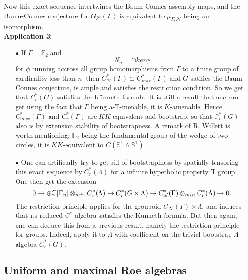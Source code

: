 Now this exact sequence intertwines the Baum-Connes assembly maps, and the Baum-Connes conjecture for $G_{\mathcal N}(\Gamma)$ is equivalent to $\mu_{\Gamma,\mathcal N}$ being an isomorphism. \\

\textbf{Application 3:} 
\begin{itemize}
\item[$\bullet$] If $\Gamma= \mathbb F_2$ and 
\[N_n = \cap ker \phi \]
for $\phi$ running accross all group homomorphisms from $\Gamma$ to a finite group of cardinality less than $n$, then $C_{\mathcal N}^*(\Gamma) \cong C_{max}^*(\Gamma)$ and $G$ satifies the Baum-Connes conjecture, is ample and satisfies the restriction condition. So we get that $C_r^*(G)$ satisfies the Künneth formula. It is still a result that one can get using the fact that $\Gamma$ being a-T-menable, it is $K$-amenable. Hence $C^*_{max}(\Gamma)$ and $C_r^*(\Gamma)$ are $KK$-equivalent and bootstrap, so that $C_r^*(G)$ also is by extension stability of bootstrapness. A remark of R. Willett is worth mentioning: $\mathbb F_2$ being the fundamental group of the wedge of two circles, it is $KK$-equivalent to $C(\mathbb S^1 \wedge \mathbb S^1)$.\\
\item[$\bullet$] One can artificially try to get rid of bootstrapiness by spatially tensoring this exact sequence by $C_r^*(\Lambda)$ for a infinite hyperbolic property T group. One then get the extension
\[ 0 \rightarrow \oplus \mathbb C[\Gamma_n] \otimes_{min} C_r^*(\Lambda) \rightarrow C_r^*(G\times \Lambda) \rightarrow C^*_{\mathcal N} (\Gamma)\otimes_{min} C_r^*(\Lambda)   \rightarrow 0.\]
The restriction principle applies for the groupoid $G_{\mathcal N}(\Gamma)\times\Lambda$, and induces that its reduced $C^*$-algebra satisfies the Künneth formula. But then again, one can deduce this from a previous result, namely the restriction principle for groups. Indeed, apply it to $\Lambda$ with coefficient on the trivial bootstrap $\Lambda$-algebra $C_r^*(G)$.	\\ 
\end{itemize} 


\subsection{Uniform and maximal Roe algebras}


